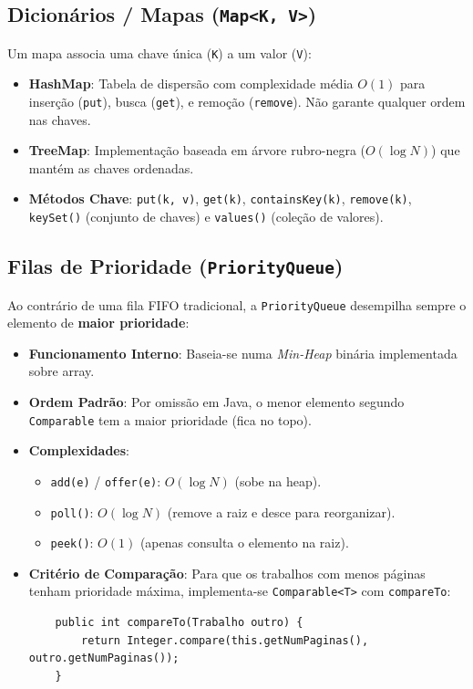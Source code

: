 \documentclass[12pt,a4paper]{article}
\begin{document}
\begin{enumerate}
\subsection*{Dicionários / Mapas (\texttt{Map<K, V>})}
Um mapa associa uma chave única (\texttt{K}) a um valor (\texttt{V}):
\begin{itemize}
    \item \textbf{HashMap}: Tabela de dispersão com complexidade média $O(1)$ para inserção (\texttt{put}), busca (\texttt{get}), e remoção (\texttt{remove}). Não garante qualquer ordem nas chaves.
    \item \textbf{TreeMap}: Implementação baseada em árvore rubro-negra ($O(\log N)$) que mantém as chaves ordenadas.
    \item \textbf{Métodos Chave}: \texttt{put(k, v)}, \texttt{get(k)}, \texttt{containsKey(k)}, \texttt{remove(k)}, \texttt{keySet()} (conjunto de chaves) e \texttt{values()} (coleção de valores).
\end{itemize}

\subsection*{Filas de Prioridade (\texttt{PriorityQueue})}
Ao contrário de uma fila FIFO tradicional, a \texttt{PriorityQueue} desempilha sempre o elemento de \textbf{maior prioridade}:
\begin{itemize}
    \item \textbf{Funcionamento Interno}: Baseia-se numa \textit{Min-Heap} binária implementada sobre array.
    \item \textbf{Ordem Padrão}: Por omissão em Java, o menor elemento segundo \texttt{Comparable} tem a maior prioridade (fica no topo).
    \item \textbf{Complexidades}:
    \begin{itemize}
        \item \texttt{add(e)} / \texttt{offer(e)}: $O(\log N)$ (sobe na heap).
        \item \texttt{poll()}: $O(\log N)$ (remove a raiz e desce para reorganizar).
        \item \texttt{peek()}: $O(1)$ (apenas consulta o elemento na raiz).
    \end{itemize}
    \item \textbf{Critério de Comparação}: Para que os trabalhos com menos páginas tenham prioridade máxima, implementa-se \texttt{Comparable<T>} com \texttt{compareTo}:
    \begin{verbatim}
    public int compareTo(Trabalho outro) {
        return Integer.compare(this.getNumPaginas(), outro.getNumPaginas());
    }
    \end{verbatim}
\end{itemize}


\end{enumerate}
\end{document}
